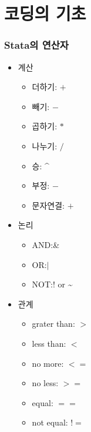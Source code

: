 \documentclass[aspectratio=169,xcolor=dvipsnames,handout]{beamer}
\begin{document}
\section{코딩의 기초}

\begin{frame}[allowframebreaks]
    \frametitle{Stata의 연산자}
    \begin{itemize}[<+->]
        \item 계산
        \begin{itemize}[<+->]
            \item 더하기: $+$
            \item 빼기: $-$
            \item 곱하기: $*$
            \item 나누기: $/$
            \item 승: \textasciicircum\relax
            \item 부정: $-$
            \item 문자연결: $+$
        \end{itemize}
        \framebreak\relax
        \item 논리
        \begin{itemize}[<+->]
            \item AND:\@ \&
            \item OR:\@ $|$
        \item NOT:\@! or \textasciitilde\relax
        \end{itemize}
        \item 관계
        \begin{itemize}[<+->]
            \item grater than: $>$
            \item less than: $<$
            \item no more: $<=$
            \item no less: $>=$
            \item equal: $==$
            \item not equal: $!=$
        \end{itemize}
    \end{itemize}
\end{frame}
\end{document}
